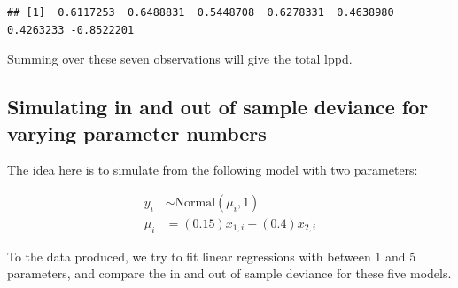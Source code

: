 \documentclass[
]{book}
\begin{document}
\begin{verbatim}
## [1]  0.6117253  0.6488831  0.5448708  0.6278331  0.4638980  0.4263233 -0.8522201
\end{verbatim}

Summing over these seven observations will give the total lppd.

\hypertarget{simulating-in-and-out-of-sample-deviance-for-varying-parameter-numbers}{%
\subsection*{Simulating in and out of sample deviance for varying parameter numbers}\label{simulating-in-and-out-of-sample-deviance-for-varying-parameter-numbers}}

The idea here is to simulate from the following model with two parameters:

\[\begin{aligned}
y_i & \sim \text{Normal}(\mu_i,1) \\
\mu_i &= (0.15)x_{1,i} - (0.4)x_{2,i}
\end{aligned}\]

To the data produced, we try to fit linear regressions with between 1 and 5 parameters, and compare the in and out of sample deviance for these five models.
\end{document}
